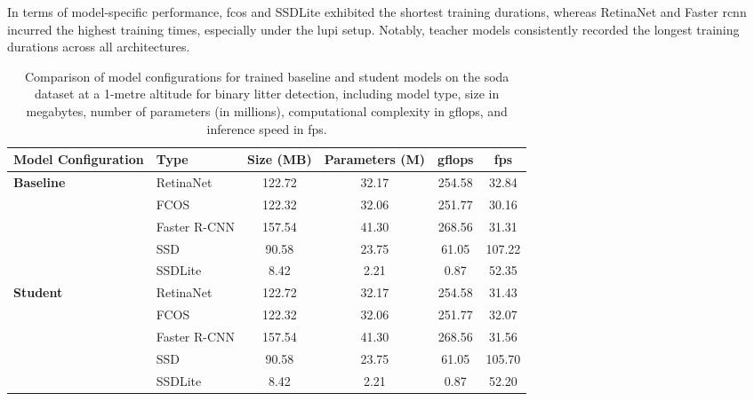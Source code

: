 In terms of model-specific performance, \gls{fcos} and SSDLite exhibited the shortest training durations, whereas RetinaNet and Faster \gls{rcnn} incurred the highest training times, especially under the \gls{lupi} setup. Notably, teacher models consistently recorded the longest training durations across all architectures.

\begin{table}[!b]
    \centering
    \begin{adjustbox}{width=\textwidth}
    \begin{tabular}{llcccc}
        \toprule
        \textbf{Model Configuration} & \textbf{Type} & \textbf{Size (MB)} & \textbf{Parameters (M)} & \textbf{\gls{gflops}} & \textbf{\gls{fps}} \\
        \midrule
        \multirow{5}{*}{\textbf{Baseline}} 
            & RetinaNet   & 122.72 & 32.17 & 254.58 & 32.84 \\
            & FCOS        & 122.32 & 32.06 & 251.77 & 30.16 \\
            & Faster R-CNN & 157.54 & 41.30 & 268.56 & 31.31 \\
            & SSD         & 90.58  & 23.75 & 61.05 & 107.22 \\
            & SSDLite     & 8.42   & 2.21 & 0.87 & 52.35 \\
        \midrule
        \multirow{5}{*}{\textbf{Student}} 
            & RetinaNet   & 122.72 & 32.17 & 254.58 & 31.43 \\
            & FCOS        & 122.32 & 32.06 & 251.77 & 32.07 \\
            & Faster R-CNN & 157.54 & 41.30 & 268.56 & 31.56 \\
            & SSD         & 90.58  & 23.75 & 61.05 & 105.70 \\
            & SSDLite     & 8.42   & 2.21 & 0.87 & 52.20\\
        \bottomrule
    \end{tabular}
    \end{adjustbox}
    \caption{Comparison of model configurations for trained baseline and student models on the \gls{soda} dataset at a 1-metre altitude for binary litter detection, including model type, size in megabytes, number of parameters (in millions), computational complexity in \gls{gflops}, and inference speed in \gls{fps}.}
    \label{tab:model_configs_soda01m}
\end{table}

